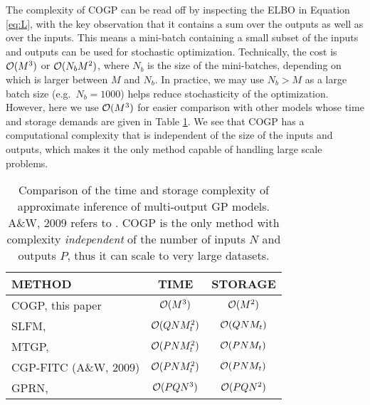 The complexity of COGP can be read off by inspecting the ELBO  in Equation \eqref{eq:L}, with the key observation that it contains 
a sum over the outputs as well as over the inputs.
This means a mini-batch containing a small subset of the inputs and outputs can be used for stochastic optimization.
Technically, the cost is $\mathcal{O}(M^3)$ or $\mathcal{O}(N_bM^2)$, where $N_b$ is the size of the mini-batches, depending on which is larger between $M$ and $N_b$. 
In practice, we may use $N_b > M$ as a large batch size (e.g.~$N_b = 1000$) helps reduce stochasticity of the optimization.
However, here we use $\mathcal{O}(M^3)$  for easier comparison with other models whose time and storage demands are 
given in Table \ref{tab:complexity}. 
We see that COGP has 
a computational  complexity that is independent of the size of the inputs and outputs, 
which makes it the only method capable of handling large scale problems.
%
\setlength{\tabcolsep}{4pt}
\begin{table}[t]
\caption{Comparison of the time and storage complexity of approximate inference of  multi-output GP models. 
A\&W, 2009 refers to \citet{alvarez-lawrence-nips-08}. COGP is the only method with complexity \emph{independent} of the
 number of inputs $N$ and outputs $P$, thus it can scale to very large datasets.}
\label{tab:complexity}
\begin{center}
\small
\begin{tabular}{lcc}
\toprule
\textbf{METHOD} & \textbf{TIME} & \textbf{STORAGE} \\ \hline
COGP, this paper  & $\mathcal{O}(M^3)$ & $\mathcal{O}(M^2)$ \\
SLFM, \citep{teh-et-al-aistats-05} & $\mathcal{O}(QNM_t^{2})$ & $\mathcal{O}(QNM_t)$ \\
MTGP, \citep{bonilla-et-al-nips-08} & $\mathcal{O}(PNM_t^2)$ & $\mathcal{O}(PNM_t)$\\ 
CGP-FITC (A\&W, 2009)& $\mathcal{O}(PNM_t^2)$ & $\mathcal{O}(PNM_t)$ \\
GPRN, \citep{wilson-et-al-icml-12} & $\mathcal{O}(PQN^3)$ & $\mathcal{O}(PQN^2)$ \\
\bottomrule
\end{tabular}
\end{center}
\end{table}

